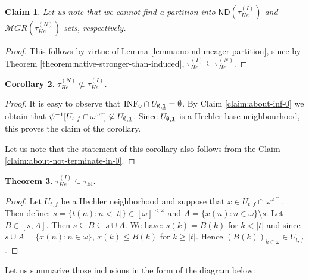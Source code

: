 \documentclass[12pt]{amsart}
\theoremstyle{plain}
\newtheorem{theorem}{Theorem}[section]
\newtheorem{corollary}[theorem]{Corollary}
\newtheorem{claim}[theorem]{Claim}
\theoremstyle{definition}
\theoremstyle{remark}
\newcommand{\finsub}{[\omega]^{<\omega}}
\newcommand{\incrbaire}{\omega^{\omega \uparrow}}
\newcommand{\inversepsi}{\psi^{-1}}
\newcommand{\meager}{{\mathcal MGR}}
\newcommand{\ND}{\mathsf{ND}}
\newcommand{\EllentuckTopology}{\tau_\mathrm{El}}
\newcommand{\Hechler}[2]{U_{#1,#2}}
\newcommand{\HechlerNative}{\tau_{\mathit{He}}^{(N)}}
\newcommand{\HechlerInduced}{\tau_{\mathit{He}}^{(I)}}
\newcommand{\ffid}{\inversepsi}
\newcommand{\INFZero}{\mathrm{INF}_0}
\newcommand{\sequenceOnes}{\underline{\bf 1}}
\begin{document}
\begin{claim}
Let us note that we cannot find a partition into
$\ND(\HechlerInduced)$ and $\meager(\HechlerNative)$ sets, respectively.
\end{claim}
\begin{proof}
This follows by virtue of Lemma \ref{lemma:no-nd-meager-partition}, since
by Theorem \ref{theorem:native-stronger-than-induced},
$\HechlerInduced \subseteq \HechlerNative$.
\end{proof}

\begin{corollary}
$\HechlerNative \not\subseteq \HechlerInduced$.
\end{corollary}

\begin{proof}
It is easy to observe that 
$\INFZero \cap \Hechler{\emptyset}{\sequenceOnes} = \emptyset$.
By Claim \ref{claim:about-inf-0} we obtain that
$\ffid[\Hechler{s}{f} \cap \incrbaire] \not\subseteq \Hechler{\emptyset}{\sequenceOnes}$.
Since $\Hechler{\emptyset}{\sequenceOnes}$ is a Hechler base neighbourhood,
this proves the claim of the corollary.

Let us note that the statement of this corollary also follows from
the Claim \ref{claim:about-not-terminate-in-0}.
\end{proof}

\begin{theorem}\label{thm:Hechler-induced-Ellentuck}
$\HechlerInduced \subseteq \EllentuckTopology$.
\end{theorem}
\begin{proof}
  Let $\Hechler{t}{f}$ be a Hechler neighborhood and suppose
  that $x \in \Hechler{t}{f} \cap \incrbaire$. Then
  define: $s = \lbrace t(n) \colon n < |t|\rbrace \in \finsub$
  and $A = \lbrace x(n) \colon n \in \omega\rbrace \setminus s$.
  Let $B \in [s,A]$. Then $s \subseteq B \subseteq s \cup A$.
  We have: $s(k) = B(k)$ for $k < |t|$ and since
  $s \cup A = \lbrace x(n) \colon n \in \omega\rbrace$,
  $x(k) \leq B(k)$ for $k \geq |t|$. Hence
  $(B(k))_{k\in\omega} \in \Hechler{t}{f}$.
\end{proof}  
Let us summarize those inclusions in the
form of the diagram below:
\end{document}
